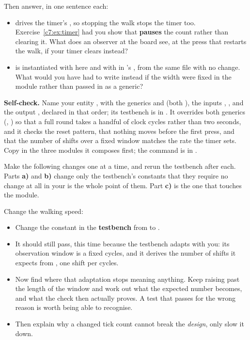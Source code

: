 Then answer, in one sentence each:
\begin{itemize}
  \item {} drives the timer's , so stopping the walk stops the timer
    too. Exercise~\ref{c7:ex:timer} had you show that  \textbf{pauses} the count rather
    than clearing it. What does an observer at the board see, at the press that restarts the walk,
    if your timer clears instead?
  \item {} is instantiated with  here and with  in
    's , from the same file with no change. What would you have had to
    write instead if the width were fixed in the module rather than passed in as a generic?
\end{itemize}


\begin{selfcheck}
\textbf{Self-check.} Name your entity , with the generics  and
 (both ), the inputs , ,  and
the output , declared in that order; its testbench is in . It
overrides both generics (, ) so that a full round takes a
handful of clock cycles rather than two seconds, and it checks the reset pattern, that nothing moves
before the first press, and that the number of shifts over a fixed window matches the rate the timer
sets. Copy in the three modules it composes first; the command is in .
\end{selfcheck}

\label{c7:ex:variants}
Make the following changes one at a time, and rerun the testbench after each. Parts \textbf{a)} and
\textbf{b)} change only the testbench's constants \textemdash{} that they require no change at all in
your  is the whole point of them. Part \textbf{c)} is the one that touches the
module.

 Change the walking speed:
\begin{itemize}
  \item Change the constant  in the \textbf{testbench} from  to .
  \item It should still pass, this time because the testbench adapts with you: its observation
    window is a fixed  cycles, and it derives the number of shifts it expects from
    , one shift per  cycles.
  \item Now find where that adaptation stops meaning anything. Keep raising  past
    the length of the window and work out what the expected number becomes, and what the check then
    actually proves. A test that passes for the wrong reason is worth being able to recognise.
  \item Then explain why a changed tick count cannot break the \emph{design}, only slow it down.
\end{itemize}

